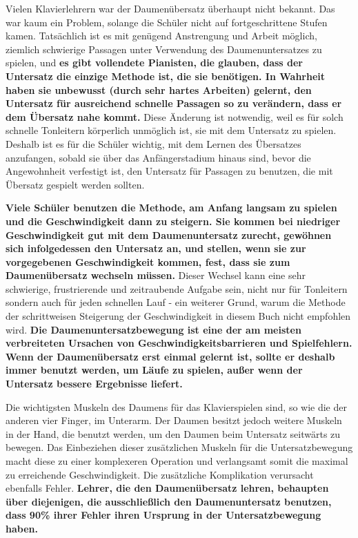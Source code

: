 Vielen Klavierlehrern war der Daumenübersatz überhaupt nicht bekannt.
Das war kaum ein Problem, solange die Schüler nicht auf fortgeschrittene Stufen kamen.
Tatsächlich ist es mit genügend Anstrengung und Arbeit möglich, ziemlich schwierige Passagen unter Verwendung des Daumenuntersatzes zu spielen, und \textbf{es gibt vollendete Pianisten, die glauben, dass der Untersatz die einzige Methode ist, die sie benötigen.
In Wahrheit haben sie unbewusst (durch sehr hartes Arbeiten) gelernt, den Untersatz für ausreichend schnelle Passagen so zu verändern, dass er  dem Übersatz nahe kommt.}
Diese Änderung ist notwendig, weil es für solch schnelle Tonleitern körperlich unmöglich ist, sie mit dem Untersatz zu spielen.
Deshalb ist es für die Schüler wichtig, mit dem Lernen des Übersatzes anzufangen, sobald sie über das Anfängerstadium hinaus sind, bevor die Angewohnheit verfestigt ist, den Untersatz für Passagen zu benutzen, die mit Übersatz gespielt werden sollten.

\textbf{Viele Schüler benutzen die Methode, am Anfang langsam zu spielen und die Geschwindigkeit dann zu steigern.
Sie kommen bei niedriger Geschwindigkeit gut mit dem Daumenuntersatz zurecht, gewöhnen sich infolgedessen den Untersatz an, und stellen, wenn sie zur vorgegebenen Geschwindigkeit kommen, fest, dass sie zum Daumenübersatz wechseln müssen.}
Dieser Wechsel kann eine sehr schwierige, frustrierende und zeitraubende Aufgabe sein, nicht nur für Tonleitern sondern auch für jeden schnellen Lauf - ein weiterer Grund, warum die Methode der schrittweisen Steigerung der Geschwindigkeit in diesem Buch nicht empfohlen wird.
\textbf{Die Daumenuntersatzbewegung ist eine der am meisten verbreiteten Ursachen von Geschwindigkeitsbarrieren und Spielfehlern.
Wenn der Daumenübersatz erst einmal gelernt ist, sollte er deshalb immer benutzt werden, um Läufe zu spielen, außer wenn der Untersatz bessere Ergebnisse liefert.}

Die wichtigsten Muskeln des Daumens für das Klavierspielen sind, so wie die der anderen vier Finger, im Unterarm.
Der Daumen besitzt jedoch weitere Muskeln in der Hand, die benutzt werden, um den Daumen beim Untersatz seitwärts zu bewegen.
Das Einbeziehen dieser zusätzlichen Muskeln für die Untersatzbewegung macht diese zu einer komplexeren Operation und verlangsamt somit die maximal zu erreichende Geschwindigkeit.
Die zusätzliche Komplikation verursacht ebenfalls Fehler.
\textbf{Lehrer, die den Daumenübersatz lehren, behaupten über diejenigen, die ausschließlich den Daumenuntersatz benutzen, dass 90\% ihrer Fehler ihren Ursprung in der Untersatzbewegung haben.}

